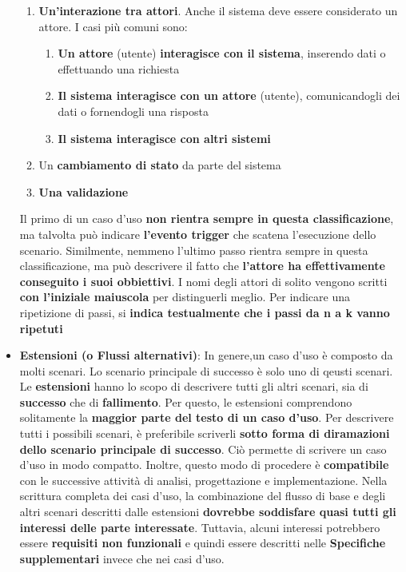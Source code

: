 \documentclass[12pt]{article}
\begin{document}
\begin{itemize}
\begin{enumerate}
        \item \textbf{Un'interazione tra attori}. Anche il sistema deve essere considerato un attore. I casi più comuni sono:
        \begin{enumerate}
            \item \textbf{Un attore} (utente) \textbf{interagisce con il sistema}, inserendo dati o effettuando una richiesta
            \item \textbf{Il sistema interagisce con un attore} (utente), comunicandogli dei dati o fornendogli una risposta
            \item \textbf{Il sistema interagisce con altri sistemi}
        \end{enumerate}
        \item Un \textbf{cambiamento di stato} da parte del sistema
        \item \textbf{Una validazione}
    \end{enumerate}  
    Il primo di un caso d'uso \textbf{non rientra sempre in questa classificazione}, ma talvolta può indicare \textbf{l'evento trigger} che scatena l'esecuzione dello scenario.
    Similmente, nemmeno l'ultimo passo rientra sempre in questa classificazione, ma può descrivere il fatto che \textbf{l'attore ha effettivamente conseguito i suoi obbiettivi}.
    I nomi degli attori di solito vengono scritti \textbf{con l'iniziale maiuscola} per distinguerli meglio.
    Per indicare una ripetizione di passi, si \textbf{indica testualmente che i passi da n a k vanno ripetuti}
    \item \textbf{Estensioni (o Flussi alternativi)}: In genere,un caso d'uso è composto da molti scenari. Lo scenario principale di successo è solo uno di qeusti scenari.
    Le \textbf{estensioni} hanno lo scopo di descrivere tutti gli altri scenari, sia di \textbf{successo} che di \textbf{fallimento}.
    Per questo, le estensioni comprendono solitamente la \textbf{maggior parte del testo di un caso d'uso}.
    Per descrivere tutti i possibili scenari, è preferibile scriverli \textbf{sotto forma di diramazioni dello scenario principale di successo}. Ciò permette di scrivere un caso d'uso in modo compatto.
    Inoltre, questo modo di procedere è \textbf{compatibile} con le successive attività di analisi, progettazione e implementazione.
    Nella scrittura completa dei casi d'uso, la combinazione del flusso di base e degli altri scenari descritti dalle estensioni \textbf{dovrebbe soddisfare quasi tutti gli interessi delle parte interessate}.
    Tuttavia, alcuni interessi potrebbero essere \textbf{requisiti non funzionali} e quindi essere descritti nelle \textbf{Specifiche supplementari} invece che nei casi d'uso.

\end{itemize}
\end{document}
